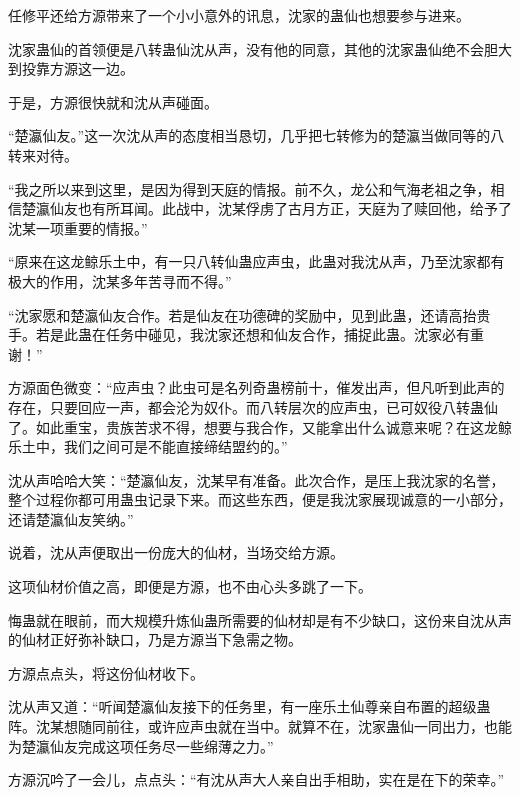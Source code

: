 \begin{this_body}
任修平还给方源带来了一个小小意外的讯息，沈家的蛊仙也想要参与进来。

沈家蛊仙的首领便是八转蛊仙沈从声，没有他的同意，其他的沈家蛊仙绝不会胆大到投靠方源这一边。

于是，方源很快就和沈从声碰面。

“楚瀛仙友。”这一次沈从声的态度相当恳切，几乎把七转修为的楚瀛当做同等的八转来对待。

“我之所以来到这里，是因为得到天庭的情报。前不久，龙公和气海老祖之争，相信楚瀛仙友也有所耳闻。此战中，沈某俘虏了古月方正，天庭为了赎回他，给予了沈某一项重要的情报。”

“原来在这龙鲸乐土中，有一只八转仙蛊应声虫，此蛊对我沈从声，乃至沈家都有极大的作用，沈某多年苦寻而不得。”

“沈家愿和楚瀛仙友合作。若是仙友在功德碑的奖励中，见到此蛊，还请高抬贵手。若是此蛊在任务中碰见，我沈家还想和仙友合作，捕捉此蛊。沈家必有重谢！”

方源面色微变：“应声虫？此虫可是名列奇蛊榜前十，催发出声，但凡听到此声的存在，只要回应一声，都会沦为奴仆。而八转层次的应声虫，已可奴役八转蛊仙了。如此重宝，贵族苦求不得，想要与我合作，又能拿出什么诚意来呢？在这龙鲸乐土中，我们之间可是不能直接缔结盟约的。”

沈从声哈哈大笑：“楚瀛仙友，沈某早有准备。此次合作，是压上我沈家的名誉，整个过程你都可用蛊虫记录下来。而这些东西，便是我沈家展现诚意的一小部分，还请楚瀛仙友笑纳。”

说着，沈从声便取出一份庞大的仙材，当场交给方源。

这项仙材价值之高，即便是方源，也不由心头多跳了一下。

悔蛊就在眼前，而大规模升炼仙蛊所需要的仙材却是有不少缺口，这份来自沈从声的仙材正好弥补缺口，乃是方源当下急需之物。

方源点点头，将这份仙材收下。

沈从声又道：“听闻楚瀛仙友接下的任务里，有一座乐土仙尊亲自布置的超级蛊阵。沈某想随同前往，或许应声虫就在当中。就算不在，沈家蛊仙一同出力，也能为楚瀛仙友完成这项任务尽一些绵薄之力。”

方源沉吟了一会儿，点点头：“有沈从声大人亲自出手相助，实在是在下的荣幸。”

\end{this_body}

